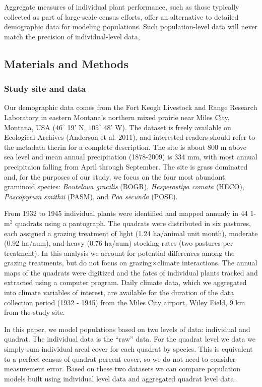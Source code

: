 \documentclass[12pt,]{article}
\begin{document}
Aggregate measures of individual plant performance, such as those
typically collected as part of large-scale census efforts, offer an
alternative to detailed demographic data for modeling populations. Such
population-level data will never match the precision of individual-level
data,

\subsection{Materials and Methods}\label{materials-and-methods}

\subsubsection{Study site and data}\label{study-site-and-data}

Our demographic data comes from the Fort Keogh Livestock and Range
Research Laboratory in eastern Montana's northern mixed prairie near
Miles City, Montana, USA ($46^{\circ}$ 19' N, $105^{\circ}$ 48' W). The
dataset is freely available on Ecological Archives (Anderson et al.
2011), and interested readers should refer to the metadata therin for a
complete description. The site is about 800 m above sea level and mean
annual precipitation (1878-2009) is 334 mm, with most annual
precipitaion falling from April through September. The site is grass
dominated and, for the purposes of our study, we focus on the four most
abundant graminoid species: \emph{Bouteloua gracilis} (BOGR),
\emph{Hesperostipa comata} (HECO), \emph{Pascopyrum smithii} (PASM), and
\emph{Poa secunda} (POSE).

From 1932 to 1945 individual plants were identified and mapped annualy
in 44 1-$\text{m}^2$ quadrats using a pantograph. The quadrats were
distributed in six pastures, each assigned a grazing treatment of light
(1.24 ha/animal unit month), moderate (0.92 ha/aum), and heavy (0.76
ha/aum) stocking rates (two pastures per treatment). In this analysis we
account for potential differences among the grazing treatments, but do
not focus on grazing$\times$climate interactions. The annual maps of the
quadrats were digitized and the fates of individual plants tracked and
extracted using a computer program. Daily climate data, which we
aggregated into climate variables of interest, are available for the
duration of the data collection period (1932 - 1945) from the Miles City
airport, Wiley Field, 9 km from the study site.

In this paper, we model populations based on two levels of data:
individual and quadrat. The individual data is the ``raw'' data. For the
quadrat level we data we simply sum individual areal cover for each
quadrat by species. This is equivalent to a perfect census of quadrat
percent cover, so we do not need to consider measurement error. Based on
these two datasets we can compare population models built using
individual level data and aggregated quadrat level data.
\end{document}
